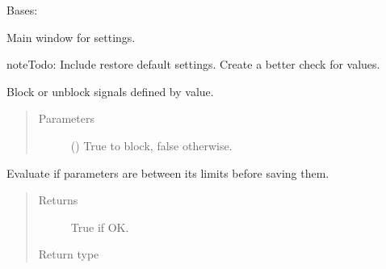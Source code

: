\documentclass[a4paper,10pt,english]{sphinxmanual}
\begin{document}
\begin{fulllineitems}
\label{\detokenize{autodoc/mrsprint/mrsprint:mrsprint.settings.Settings}}
Bases: 

Main window for settings.

\begin{sphinxadmonition}{note}{\label{autodoc/mrsprint/mrsprint:index-4}Todo:}
Include restore default settings.
Create a better check for values.
\end{sphinxadmonition}

\begin{fulllineitems}
\label{\detokenize{autodoc/mrsprint/mrsprint:mrsprint.settings.Settings.blockUnblockSignals}}
Block or unblock signals defined by value.
\begin{quote}\begin{description}
\item[{Parameters}] \leavevmode
{} () \textendash{} True to block, false otherwise.

\end{description}\end{quote}

\end{fulllineitems}


\begin{fulllineitems}
\label{\detokenize{autodoc/mrsprint/mrsprint:mrsprint.settings.Settings.check}}
Evaluate if parameters are between its limits before saving them.
\begin{quote}\begin{description}
\item[{Returns}] \leavevmode
True if OK.

\item[{Return type}] \leavevmode
{}


\end{description}
\end{quote}
\end{fulllineitems}
\end{fulllineitems}
\end{document}
